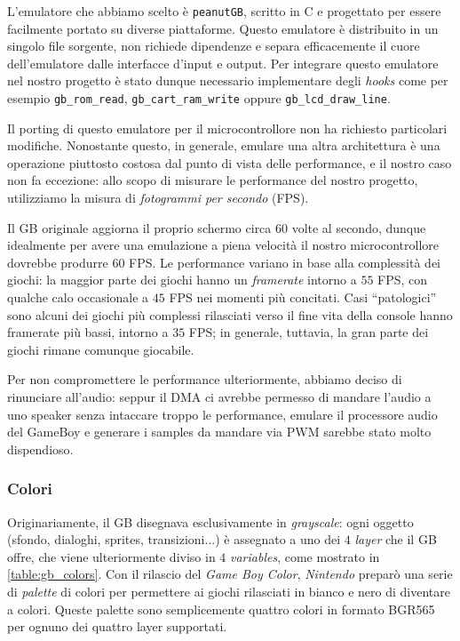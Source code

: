 \documentclass[hidelinks,12pt]{article}
\begin{document}
L'emulatore che abbiamo scelto è \texttt{peanutGB}, scritto in C e progettato
per essere facilmente portato su diverse piattaforme.
Questo emulatore è distribuito in un singolo file sorgente, non richiede
dipendenze e separa efficacemente il cuore dell'emulatore dalle interfacce
d'input e output.
Per integrare questo emulatore nel nostro progetto è stato dunque necessario
implementare degli \textit{hooks} come per esempio \texttt{gb\_rom\_read},
\texttt{gb\_cart\_ram\_write} oppure \texttt{gb\_lcd\_draw\_line}.

Il porting di questo emulatore per il microcontrollore non ha richiesto
particolari modifiche. Nonostante questo, in generale, emulare una altra
architettura è una operazione piuttosto costosa dal punto di vista delle
performance, e il nostro caso non fa eccezione: allo scopo di misurare le
performance del nostro progetto, utilizziamo la misura di \textit{fotogrammi
per secondo} (FPS). 

Il GB originale aggiorna il proprio schermo circa 60 volte al secondo, dunque
idealmente per avere una emulazione a piena velocità il nostro microcontrollore
dovrebbe produrre $60$ FPS. Le performance variano in base alla complessità dei
giochi: la maggior parte dei giochi hanno un \textit{framerate} intorno a $55$
FPS, con qualche calo occasionale a $45$ FPS nei momenti più concitati.
Casi ``patologici'' sono alcuni dei giochi più complessi rilasciati verso il
fine vita della console hanno framerate più bassi, intorno a $35$ FPS; 
in generale, tuttavia, la gran parte dei giochi rimane comunque giocabile. 

Per non compromettere le performance ulteriormente, abbiamo deciso di rinunciare
all'audio: seppur il DMA ci avrebbe permesso di mandare l'audio a uno speaker
senza intaccare troppo le performance, emulare il processore audio del GameBoy e
generare i samples da mandare via PWM sarebbe stato molto dispendioso.

\subsubsection{Colori}
Originariamente, il GB disegnava esclusivamente in \textit{grayscale}: ogni
oggetto (sfondo, dialoghi, sprites, transizioni...) è assegnato a uno dei $4$
\textit{layer} che il GB offre, che viene ulteriormente diviso in $4$
\textit{variables}, come mostrato in \cref{table:gb_colors}.
Con il rilascio del \textit{Game Boy Color}, \textit{Nintendo} preparò una serie
di \textit{palette} di colori per permettere ai giochi rilasciati in bianco e nero
di diventare a colori. Queste palette sono semplicemente quattro colori in formato BGR565
per ognuno dei quattro layer supportati.
\end{document}
